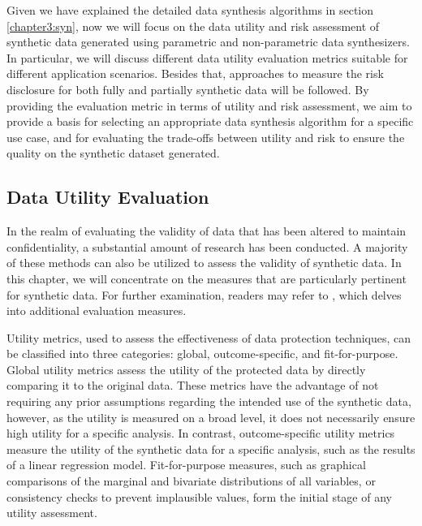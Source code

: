 Given we have explained the detailed data synthesis algorithms in section \ref{chapter3:syn}, now we will focus on the data utility and risk assessment of synthetic data generated using parametric and non-parametric data synthesizers. In particular, we will discuss different data utility evaluation metrics suitable for different application scenarios. Besides that, approaches to measure the risk disclosure for both fully and partially synthetic data will be followed. By providing the evaluation metric in terms of utility and risk assessment, we aim to provide a basis for selecting an appropriate data synthesis algorithm for a specific use case, and for evaluating the trade-offs between utility and risk to ensure the quality on the synthetic dataset generated.

\subsection{Data Utility Evaluation}
\label{subsec:utility}
In the realm of evaluating the validity of data that has been altered to maintain confidentiality, a substantial amount of research has been conducted. A majority of these methods can also be utilized to assess the validity of synthetic data. In this chapter, we will concentrate on the measures that are particularly pertinent for synthetic data. For further examination, readers may refer to \citet{hundepool2012statistical}, which delves into additional evaluation measures.

Utility metrics, used to assess the effectiveness of data protection techniques, can be classified into three categories: global, outcome-specific, and fit-for-purpose. Global utility metrics assess the utility of the protected data by directly comparing it to the original data. These metrics have the advantage of not requiring any prior assumptions regarding the intended use of the synthetic data, however, as the utility is measured on a broad level, it does not necessarily ensure high utility for a specific analysis. In contrast, outcome-specific utility metrics measure the utility of the synthetic data for a specific analysis, such as the results of a linear regression model. Fit-for-purpose measures, such as graphical comparisons of the marginal and bivariate distributions of all variables, or consistency checks to prevent implausible values, form the initial stage of any utility assessment.
